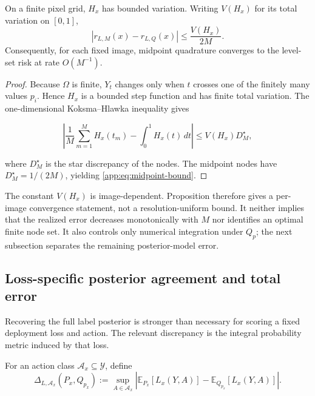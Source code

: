 \begin{proposition}
\label{app:prop:midpoint-bound}
On a finite pixel grid, $H_x$ has bounded variation.  Writing
$V(H_x)$ for its total variation on $[0,1]$,
\begin{equation}
  \left|r_{L,M}(x)-r_{L,Q}(x)\right|
  \leq \frac{V(H_x)}{2M}.
  \label{app:eq:midpoint-bound}
\end{equation}
Consequently, for each fixed image, midpoint quadrature converges to the
level-set risk at rate $O(M^{-1})$.
\end{proposition}

\begin{proof}
Because $\Omega$ is finite, $Y_t$ changes only when $t$ crosses one of
the finitely many values $p_i$.  Hence $H_x$ is a bounded step function
and has finite total variation.  The one-dimensional
Koksma--Hlawka inequality \citep{niederreiter1992} gives

\begin{equation*}
  \left|
    \frac1M\sum_{m=1}^M H_x(t_m)-\int_0^1H_x(t)\,dt
  \right|
  \leq V(H_x)D_M^\star,
\end{equation*}

where $D_M^\star$ is the star discrepancy of the nodes.  The midpoint
nodes have $D_M^\star=1/(2M)$, yielding
\cref{app:eq:midpoint-bound}.
\end{proof}

The constant $V(H_x)$ is image-dependent.  Proposition
 therefore gives a per-image convergence
statement, not a resolution-uniform bound.  It neither implies that the
realized error decreases monotonically with $M$ nor identifies an
optimal finite node set.  It also controls only numerical integration
under $Q_p$; the next subsection separates the remaining posterior-model
error.

\subsection{Loss-specific posterior agreement and total error}

Recovering the full label posterior is stronger than necessary for
scoring a fixed deployment loss and action.  The relevant discrepancy is
the integral probability metric induced by that loss.

\begin{definition}
\label{app:def:loss-ipm}
For an action class $\mathcal{A}_x\subseteq\mathcal{Y}$, define
\begin{equation}
  \Delta_{L,\mathcal{A}_x}(P_x,Q_{p_x})
  :=\sup_{A\in\mathcal{A}_x}
    \left|
      \mathbb{E}_{P_x}[L_x(Y,A)]
      -\mathbb{E}_{Q_{p_x}}[L_x(Y,A)]
    \right|.
  \label{app:eq:loss-ipm}
\end{equation}
\end{definition}

